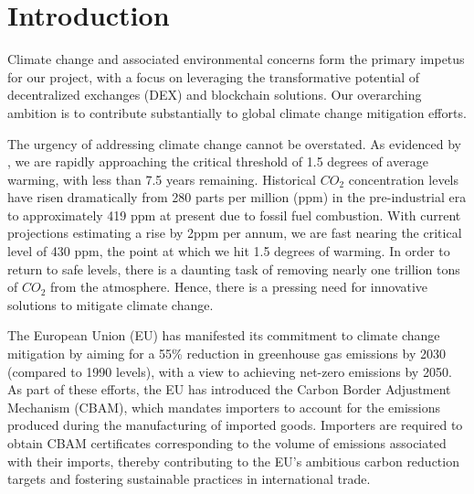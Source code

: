 \documentclass[sigconf, authordraft]{acmart}
\begin{document}
	  

	\maketitle


	\section{Introduction}


	Climate change and associated environmental concerns form the primary impetus for
	our project, with a focus on leveraging the transformative potential of
	decentralized exchanges (DEX) and blockchain solutions. Our overarching ambition
	is to contribute substantially to global climate change mitigation efforts.

	The urgency of addressing climate change cannot be overstated. As evidenced by
	\cite{-remaininga} , we are rapidly approaching the critical threshold of 1.5
	degrees of average warming, with less than 7.5 years remaining. Historical
	$CO_{2}$ concentration levels have risen dramatically from 280 parts per
	million (ppm) in the pre-industrial era to approximately 419 ppm at present
	due to fossil fuel combustion. With current projections estimating a rise by 2ppm
	per annum, we are fast nearing the critical level of 430 ppm, the point at which
	we hit 1.5 degrees of warming. In order to return to safe levels, there is a daunting
	task of removing nearly one trillion tons of $CO_{2}$ from the atmosphere.
	Hence, there is a pressing need for innovative solutions to mitigate climate change.

	The European Union (EU) has manifested its commitment to climate change mitigation
	by aiming for a 55\% reduction in greenhouse gas emissions by 2030 (compared to
	1990 levels), with a view to achieving net-zero emissions by 2050. As part of these
	efforts, the EU has introduced the Carbon Border Adjustment Mechanism (CBAM), which
	mandates importers to account for the emissions produced during the manufacturing
	of imported goods. Importers are required to obtain CBAM certificates
	corresponding to the volume of emissions associated with their imports, thereby
	contributing to the EU's ambitious carbon reduction targets and fostering sustainable
	practices in international trade.
\end{document}
